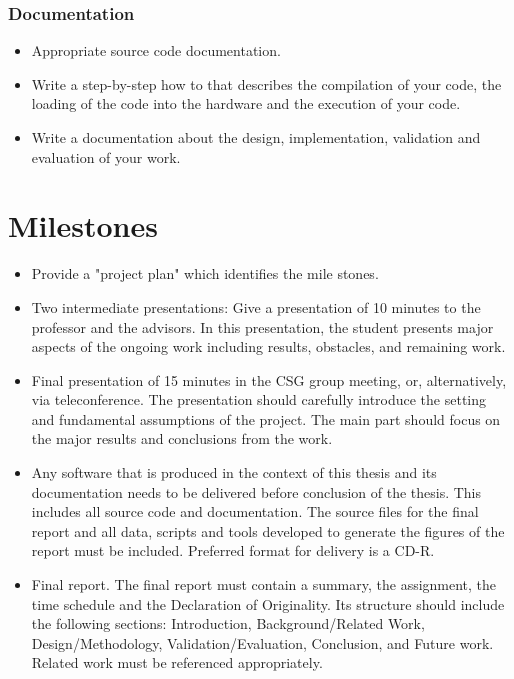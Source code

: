 \subsubsection{Documentation}
\begin{itemize}
	\item Appropriate source code documentation.
        \item Write a step-by-step how to that describes the compilation of your code, the loading of the code into the hardware and the execution of your code.
	\item Write a documentation about the design, implementation, validation and evaluation of your work.
\end{itemize}


\section{Milestones}
\begin{itemize}
    \item Provide a "project plan" which identifies the mile stones. 
    \item Two intermediate presentations: Give a presentation of 10 minutes to the professor and the advisors. 
    			In this presentation, the student presents major aspects of the ongoing work including results, obstacles, and remaining work.
    \item Final presentation of 15 minutes in the CSG group meeting, or, alternatively, via teleconference. 
    			The presentation should carefully introduce the setting and fundamental assumptions of the project. 
    			The main part should focus on the major results and conclusions from the work.
    \item Any software that is produced in the context of this thesis and its documentation needs to be delivered before conclusion of the thesis. 
    	This includes all source code and documentation.
    	The source files for the final report and all data, scripts and tools developed to generate the figures of the report must be included. 
    	Preferred format for delivery is a CD-R.
    \item Final report. The final report must contain a summary, the assignment, the time schedule and the Declaration of Originality. Its structure should include the following sections: Introduction, Background/Related Work, Design/Methodology, Validation/Evaluation, Conclusion, and Future work. Related work must be referenced appropriately.
\end{itemize}


